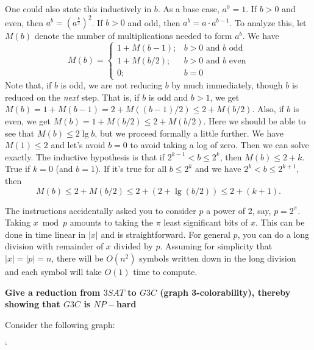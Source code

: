 \documentclass[2pt]{scrartcl}
\begin{document}
\begin{multicols}{6}
  One could also state this inductively in $b$.  As a base case,
  $a^0=1$.  If $b>0$ and even, then
  $a^b=\left(a^{\frac b2}\right)^2$.  If $b>0$ and odd, then
  $a^b=a\cdot a^{b-1}$.  To analyze this, let $M(b)$ denote the number
  of multiplications needed to form $a^b$.  We have
  \[
    M(b)=
    \left\{
      \begin{array}{ll}
        1+M(b-1); & \mbox{$b>0$ and $b$ odd}\\
        1+M(b/2); & \mbox{$b>0$ and $b$ even}\\
               0; & \mbox{$b=0$}
      \end{array}
      \right.
    \]
    Note that, if $b$ is odd, we are not reducing $b$ by much immediately,
    though $b$ is reduced on the {\em next} step.  That is, if $b$ is odd
    and $b>1$, we get $M(b)=1+M(b-1)=2+M((b-1)/2)\le 2+M(b/2)$.  Also, if
    $b$ is even, we get $M(b)=1+M(b/2)\le2+M(b/2)$.  Here we should be
    able to see that $M(b)\le 2\lg b$, but we proceed formally a little
    further.  We have $M(1)\le 2$ and
    let's avoid $b=0$ to avoid taking a log of zero.  Then we can solve
    exactly.  The inductive hypothesis is that if $2^{k-1}<b\le 2^k$, then
    $M(b)\le 2+k$.  True if $k=0$ (and $b=1$).  If it's true for all $b\le
    2^k$ and we have $2^k<b\le 2^{k+1}$, then
    \[M(b)\le 2+M(b/2)\le2+(2+\lg(b/2))\le 2+(k+1).\]

    The instructions accidentally asked you to consider $p$ a power of 2,
    say, $p=2^\pi$.  Taking $x\bmod p$ amounts to taking the $\pi$ least
    significant bits of $x$.  This can be done in time linear in $|x|$ and
    is straightforward.  For general $p$, you can do a long division with
    remainder of $x$ divided by $p$.  Assuming for simplicity that
    $|x|=|p|=n$, there will be $O(n^2)$ symbols written down in the long
    division and each symbol will take $O(1)$ time to compute.

    {\bf Give a reduction from $3SAT$ to $G3C$ (graph 3-colorability), thereby showing that $G3C$ is $NP-$hard}

    Consider the following graph:

    \begin{center}
      `
\end{center}
\end{multicols}
\end{document}
